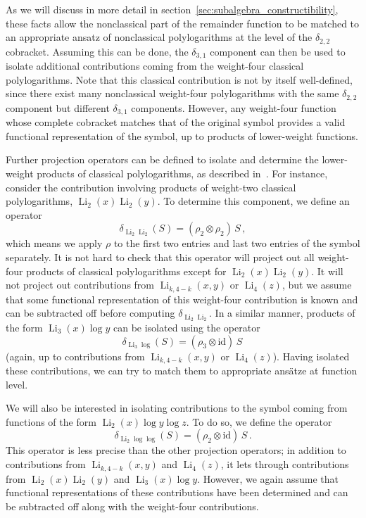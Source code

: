 \documentclass[11pt]{article}
\DeclareMathOperator{\Li}{Li}
\begin{document}
As we will discuss in more detail in section~\ref{sec:subalgebra_constructibility}, these facts allow the nonclassical part of the remainder function to be matched to an appropriate ansatz of nonclassical polylogarithms at the level of the $\delta_{2,2}$ cobracket. Assuming this can be done, the $\delta_{3,1}$ component can then be used to isolate additional contributions coming from the weight-four classical polylogarithms. Note that this classical contribution is not by itself well-defined, since there exist many nonclassical weight-four polylogarithms with the same $\delta_{2,2}$ component but different $\delta_{3,1}$ components. However, any weight-four function whose complete cobracket matches that of the original symbol provides a valid functional representation of the symbol, up to products of lower-weight functions.  

Further projection operators can be defined to isolate and determine the lower-weight products of classical polylogarithms, as described in~\cite{Goncharov:2010jf}. For instance, consider the contribution involving products of weight-two classical polylogarithms, $\Li_2(x) \Li_2(y)$. To determine this component, we define an operator
\begin{equation}
\delta_{\Li_2 \Li_2} (S)= (\rho_2 \otimes \rho_2)\, S \, , \label{eq:proj_op_1}
\end{equation}
which means we apply $\rho$ to the first two entries and last two entries of the symbol separately. It is not hard to check that this operator will project out all weight-four products of classical polylogarithms except for $\Li_2(x) \Li_2(y)$. It will not project out contributions from $\Li_{k,4-k}(x,y)$ or $\Li_4(z)$, but we assume that some functional representation of this weight-four contribution is known and can be subtracted off before computing $\delta_{\Li_2 \Li_2}$. In a similar manner, products of the form $\Li_3(x) \log y$ can be isolated using the operator
\begin{equation}
\delta_{\Li_3 \log} (S)= (\rho_3 \otimes \text{id})\, S \,  \label{eq:proj_op_2} 
\end{equation}
(again, up to contributions from $\Li_{k,4-k}(x,y)$ or $\Li_4(z)$).  Having isolated these contributions, we can try to match them to appropriate ans{\"a}tze at function level.

We will also be interested in isolating contributions to the symbol coming from functions of the form $\Li_2(x) \log y  \log z$. To do so, we define the operator
\begin{equation}
\delta_{\Li_2 \log \log} (S)= (\rho_2 \otimes \text{id})\, S \, . \label{eq:proj_op_3}
\end{equation}
This operator is less precise than the other projection operators; in addition to contributions from $\Li_{k,4-k}(x,y)$ and $\Li_4(z)$, it lets through contributions from $\Li_2(x) \Li_2(y)$ and $\Li_3(x) \log y$. However, we again assume that functional representations of these contributions have been determined and can be subtracted off along with the weight-four contributions. 
\end{document}
